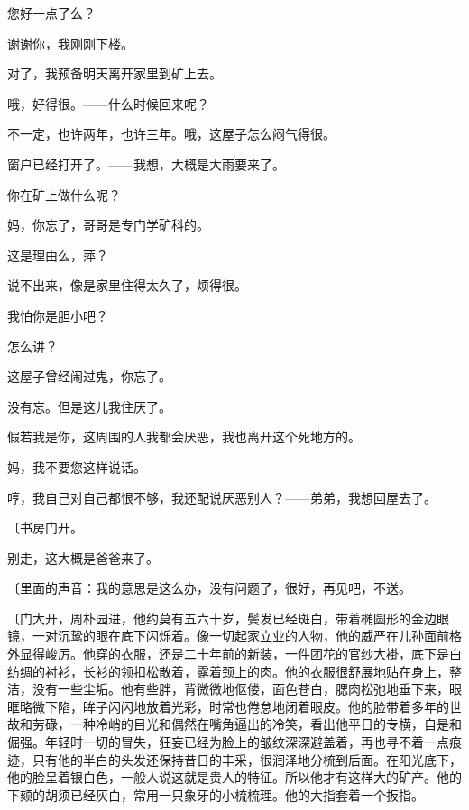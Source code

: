 您好一点了么？

谢谢你，我刚刚下楼。

对了，我预备明天离开家里到矿上去。

哦，好得很。——什么时候回来呢？

不一定，也许两年，也许三年。哦，这屋子怎么闷气得很。

窗户已经打开了。——我想，大概是大雨要来了。

你在矿上做什么呢？

妈，你忘了，哥哥是专门学矿科的。

这是理由么，萍？

说不出来，像是家里住得太久了，烦得很。

我怕你是胆小吧？

怎么讲？

这屋子曾经闹过鬼，你忘了。

没有忘。但是这儿我住厌了。

假若我是你，这周围的人我都会厌恶，我也离开这个死地方的。

妈，我不要您这样说话。

哼，我自己对自己都恨不够，我还配说厌恶别人？——弟弟，我想回屋去了。

{\fangsong〔书房门开。}

别走，这大概是爸爸来了。

{\fangsong〔里面的声音：我的意思是这么办，没有问题了，很好，再见吧，不送。}

{\fangsong〔门大开，周朴园进，他约莫有五六十岁，鬓发已经斑白，带着椭圆形的金边眼镜，一对沉鸷的眼在底下闪烁着。像一切起家立业的人物，他的威严在儿孙面前格外显得峻厉。他穿的衣服，还是二十年前的新装，一件团花的官纱大褂，底下是白纺绸的衬衫，长衫的领扣松散着，露着颈上的肉。他的衣服很舒展地贴在身上，整洁，没有一些尘垢。他有些胖，背微微地伛偻，面色苍白，腮肉松弛地垂下来，眼眶略微下陷，眸子闪闪地放着光彩，时常也倦怠地闭着眼皮。他的脸带着多年的世故和劳碌，一种冷峭的目光和偶然在嘴角逼出的冷笑，看出他平日的专横，自是和倔强。年轻时一切的冒失，狂妄已经为脸上的皱纹深深避盖着，再也寻不着一点痕迹，只有他的半白的头发还保持昔日的丰采，很润泽地分梳到后面。在阳光底下，他的脸呈着银白色，一般人说这就是贵人的特征。所以他才有这样大的矿产。他的下颏的胡须已经灰白，常用一只象牙的小梳梳理。他的大指套着一个扳指。}

